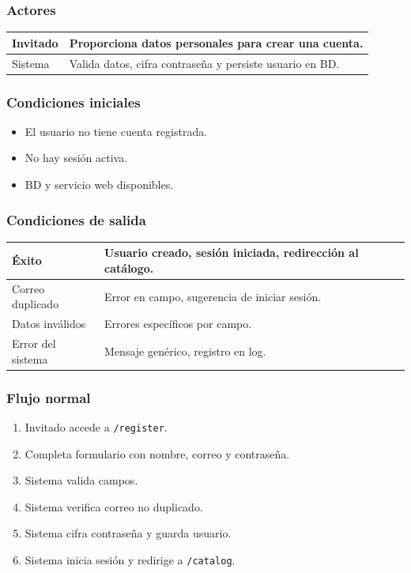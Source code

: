 \documentclass[12pt,a4paper]{article}
\begin{document}
\subsubsection*{Actores}
\begin{longtable}{|l|p{10cm}|}
    \hline
    Invitado & Proporciona datos personales para crear una cuenta.      \\ \hline
    Sistema  & Valida datos, cifra contraseña y persiste usuario en BD. \\ \hline
\end{longtable}

\subsubsection*{Condiciones iniciales}
\begin{itemize}[label=--]
    \item El usuario no tiene cuenta registrada.
    \item No hay sesión activa.
    \item BD y servicio web disponibles.
\end{itemize}

\subsubsection*{Condiciones de salida}
\begin{longtable}{|l|p{10cm}|}
    \hline
    Éxito             & Usuario creado, sesión iniciada, redirección al catálogo. \\ \hline
    Correo duplicado  & Error en campo, sugerencia de iniciar sesión.             \\ \hline
    Datos inválidos   & Errores específicos por campo.                            \\ \hline
    Error del sistema & Mensaje genérico, registro en log.                        \\ \hline
\end{longtable}

\subsubsection*{Flujo normal}
\begin{enumerate}[label=FN-\arabic*]
    \item Invitado accede a \texttt{/register}.
    \item Completa formulario con nombre, correo y contraseña.
    \item Sistema valida campos.
    \item Sistema verifica correo no duplicado.
    \item Sistema cifra contraseña y guarda usuario.
    \item Sistema inicia sesión y redirige a \texttt{/catalog}.
\end{enumerate}
\end{document}
